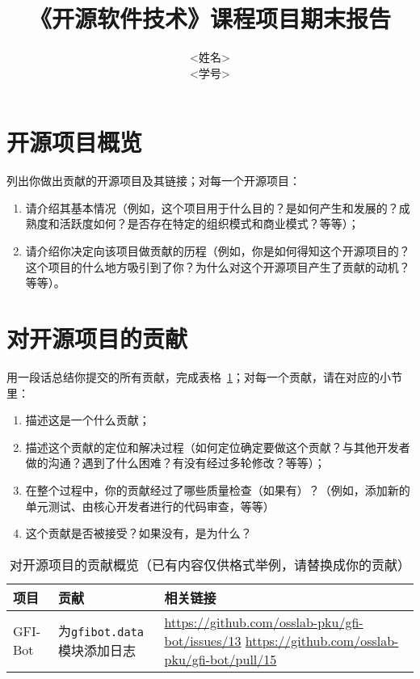 \documentclass[lang=cn,11pt,a4paper,cite=authoryear]{elegantpaper}
\title{《开源软件技术》课程项目期末报告}
\author{
<姓名>\\<学号>\\\email{xxxxx@pku.edu.cn}
}
\date{}
\begin{document}
\maketitle

\section{开源项目概览}

\begin{tcolorbox}[title=\textbf{请在这一节包含如下内容：},colback=yellow!10!white]
  列出你做出贡献的开源项目及其链接；对每一个开源项目：
  \begin{enumerate}
    \item 请介绍其基本情况（例如，这个项目用于什么目的？是如何产生和发展的？成熟度和活跃度如何？是否存在特定的组织模式和商业模式？等等）；
    \item 请介绍你决定向该项目做贡献的历程（例如，你是如何得知这个开源项目的？这个项目的什么地方吸引到了你？为什么对这个开源项目产生了贡献的动机？等等）。
  \end{enumerate}
\end{tcolorbox}

\section{对开源项目的贡献}

\begin{tcolorbox}[title=\textbf{请在这一节包含如下内容：},colback=yellow!10!white]
用一段话总结你提交的所有贡献，完成表格~\ref{tab:contrib}；对每一个贡献，请在对应的小节里：
\begin{enumerate}
    \item 描述这是一个什么贡献；
    \item 描述这个贡献的定位和解决过程（如何定位确定要做这个贡献？与其他开发者做的沟通？遇到了什么困难？有没有经过多轮修改？等等）；
    \item 在整个过程中，你的贡献经过了哪些质量检查（如果有）？（例如，添加新的单元测试、由核心开发者进行的代码审查，等等）
    \item 这个贡献是否被接受？如果没有，是为什么？
\end{enumerate}
\end{tcolorbox}

\begin{table}[]
    \centering
    \caption{对开源项目的贡献概览（已有内容仅供格式举例，请替换成你的贡献）}
    \begin{tabular}{llp{9cm}}
      \toprule
        项目 & 贡献 & 相关链接 \\
      \midrule
        GFI-Bot & 为\texttt{gfibot.data}模块添加日志 & \url{https://github.com/osslab-pku/gfi-bot/issues/13} \newline \url{https://github.com/osslab-pku/gfi-bot/pull/15}\\ 
      \bottomrule
    \end{tabular}
    \label{tab:contrib}
\end{table}
\end{document}
